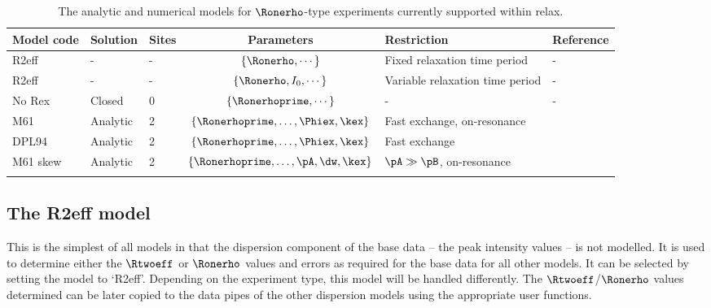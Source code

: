 \begin{table}
\begin{center}
\caption{The analytic and numerical models for $\Ronerho$-type experiments currently supported within relax.}
\begin{tabular}{lllcll}
\toprule
Model code & Solution & Sites & Parameters                                        & Restriction                       & Reference \\
\midrule                       
R2eff      & -        & -     & $\{\Ronerho, \cdots\}$                            & Fixed relaxation time period      & - \\
R2eff      & -        & -     & $\{\Ronerho, I_0, \cdots\}$                       & Variable relaxation time period   & - \\
No Rex     & Closed   & 0     & $\{\Ronerhoprime, \cdots\}$                       & -                                 & - \\
M61        & Analytic & 2     & $\{\Ronerhoprime, \dots, \Phiex, \kex\}$          & Fast exchange, on-resonance       & \citet{Meiboom61} \\
DPL94      & Analytic & 2     & $\{\Ronerhoprime, \dots, \Phiex, \kex\}$          & Fast exchange                     & \citet{Davis94} \\
M61 skew   & Analytic & 2     & $\{\Ronerhoprime, \dots, \pA, \dw, \kex\}$        & $\pA \gg \pB$, on-resonance       & \citet{Meiboom61} \\
\bottomrule
\label{table: R1rho dispersion models}
\end{tabular}
\end{center}
\end{table}



\clearpage

\subsection{The R2eff model}
\label{sect: dispersion: R2eff model}

This is the simplest of all models in that the dispersion component of the base data -- the peak intensity values -- is not modelled.  It is used to determine either the $\Rtwoeff$ or $\Ronerho$ values and errors as required for the base data for all other models.  It can be selected by setting the model to `R2eff'.  Depending on the experiment type, this model will be handled differently.  The $\Rtwoeff$/$\Ronerho$ values determined can be later copied to the data pipes of the other dispersion models using the appropriate user functions.


